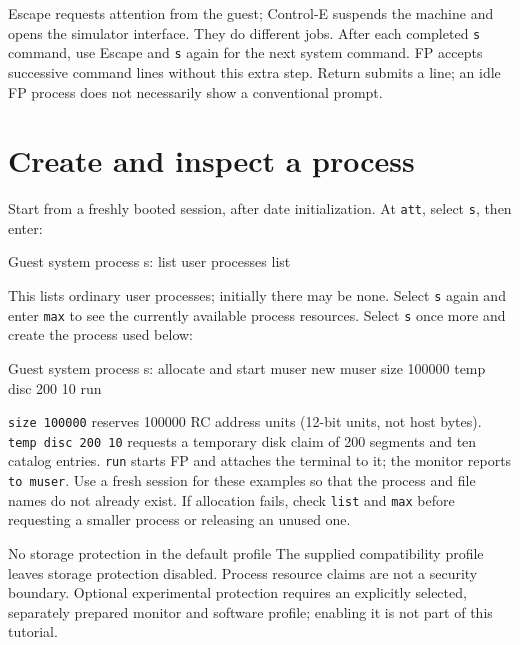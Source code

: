 Escape requests attention from the guest; Control-E suspends the machine and opens the simulator interface. They do different jobs. After each completed \passthrough{\lstinline!s!} command, use Escape and \passthrough{\lstinline!s!} again for the next system command. FP accepts successive command lines without this extra step. Return submits a line; an idle FP process does not necessarily show a conventional prompt.

\section{Create and inspect a process}\label{create-and-inspect-a-process}

Start from a freshly booted session, after date initialization. At \passthrough{\lstinline!att!}, select \passthrough{\lstinline!s!}, then enter:

\begin{commandexample}{Guest system process s: list user processes}
list
\end{commandexample}

This lists ordinary user processes; initially there may be none. Select \passthrough{\lstinline!s!} again and enter \passthrough{\lstinline!max!} to see the currently available process resources. Select \passthrough{\lstinline!s!} once more and create the process used below:

\begin{commandexample}{Guest system process s: allocate and start muser}
new muser size 100000 temp disc 200 10 run
\end{commandexample}

\passthrough{\lstinline!size 100000!} reserves 100000 RC address units (12-bit units, not host bytes). \passthrough{\lstinline!temp disc 200 10!} requests a temporary disk claim of 200 segments and ten catalog entries. \passthrough{\lstinline!run!} starts FP and attaches the terminal to it; the monitor reports \passthrough{\lstinline!to muser!}. Use a fresh session for these examples so that the process and file names do not already exist. If allocation fails, check \passthrough{\lstinline!list!} and \passthrough{\lstinline!max!} before requesting a smaller process or releasing an unused one.

\begin{operationnote}{No storage protection in the default profile}
The supplied compatibility profile leaves storage protection disabled. Process resource claims are not a security boundary. Optional experimental protection requires an explicitly selected, separately prepared monitor and software profile; enabling it is not part of this tutorial.
\end{operationnote}


